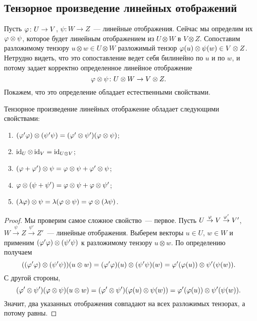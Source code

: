 \subsection{Тензорное произведение линейных отображений}


Пусть $\varphi\colon U\to V$, $\psi\colon W\to Z$~--- линейные
отображения. Сейчас мы определим их 
$\varphi\otimes\psi$, которое будет линейным отображением из $U\otimes W$
в $V\otimes Z$.
Сопоставим разложимому тензору $u\otimes w\in U\otimes W$
разложимый тензор $\varphi(u)\otimes\psi(w)\in V\otimes Z$. Нетрудно
видеть, что это сопоставление ведет себя билинейно по $u$ и по $w$, и
потому задает корректно определенное линейное отображение
$$\varphi\otimes\psi\colon U\otimes W\to V\otimes Z.$$
Покажем, что это определение обладает естественными свойствами.

\begin{theorem}\label{thm:tensor_product_maps}
Тензорное произведение линейных отображение обладает следующими
свойствами:
\begin{enumerate}
\item $(\varphi'\varphi)\otimes(\psi'\psi) =
  (\varphi'\otimes\psi')(\varphi\otimes\psi)$;
\item $\operatorname{id}_U\otimes\operatorname{id}_V = \operatorname{id}_{U\otimes V}$;
\item $(\varphi+\varphi')\otimes\psi = \varphi\otimes\psi + \varphi'\otimes\psi$;
\item $\varphi\otimes(\psi+\psi') = \varphi\otimes\psi + \varphi\otimes\psi'$;
\item $(\lambda\varphi)\otimes\psi = \lambda(\varphi\otimes\psi) = \varphi\otimes(\lambda\psi)$.
\end{enumerate}
\end{theorem}
\begin{proof}
Мы проверим самое сложное свойство~--- первое.
Пусть $U\stackrel{\varphi}{\to} V \stackrel{\varphi'}{\to} V'$,
$W\stackrel{\psi}{\to} Z \stackrel{\psi'}{\to} Z'$~--- линейные
отображения.
Выберем векторы $u\in U$, $w\in W$ и применим
$(\varphi'\varphi)\otimes(\psi'\psi)$ к разложимому тензору $u\otimes w$. По
определению получаем
$$
((\varphi'\varphi)\otimes(\psi'\psi))(u\otimes w) =
(\varphi'\varphi)(u)\otimes(\psi'\psi)(w) =
\varphi'(\varphi(u))\otimes\psi'(\psi(w)).
$$
С другой стороны,
$$
(\varphi'\otimes\psi')(\varphi\otimes\psi)(u\otimes w) =
(\varphi'\otimes\psi')(\varphi(u)\otimes\psi(w)) =
\varphi'(\varphi(u))\otimes\psi'(\psi(w)).
$$
Значит, два указанных отображения совпадают на всех разложимых
тензорах, а потому равны.
\end{proof}

